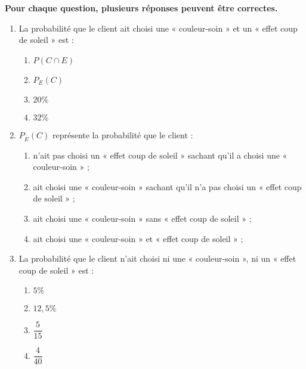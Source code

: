 \documentclass[a4paper,11pt,exos]{nsi} %
\begin{document}
\textbf{Pour chaque question, plusieurs réponses peuvent être correctes.}
\begin{enumerate}[label=]
    \item La probabilité que le client ait choisi une « couleur-soin » et un « effet coup de soleil » est :
    \begin{multicols}{4}
        \begin{enumerate}[label=]
            \item \textcolor{UGLiBlue}{$P(C \cap E)$}
            \item {} $P_E(C)$
            \item \textcolor{UGLiBlue}{ $20\%$}
            \item {} $32\%$
        \end{enumerate}
    \end{multicols}

    \item $P_{\overline{E}}(C)$ représente la probabilité que le client :
    \begin{enumerate}[label=]
        \item {} n'ait pas choisi un « effet coup de soleil » sachant qu'il a choisi une « couleur-soin » ;
        \item \textcolor{UGLiBlue}{ ait choisi une « couleur-soin » sachant qu'il n'a pas choisi un « effet coup de soleil » ;}
        \item {} ait  choisi une « couleur-soin » sans « effet coup de soleil » ;
        \item {} ait  choisi une « couleur-soin » et « effet coup de soleil » ;
    \end{enumerate}

    \item La probabilité que le client n'ait choisi ni une « couleur-soin », ni un « effet coup de soleil » est :
    \begin{multicols}{4}
        \begin{enumerate}[label=]
            \item {} $5 \%$
            \item \textcolor{UGLiBlue}{ $12,5 \%$}
            \item {}$\dfrac{5}{15}$
            \item {} $\dfrac{4}{40}$
        \end{enumerate}
    \end{multicols}
\end{enumerate}
\end{document}
